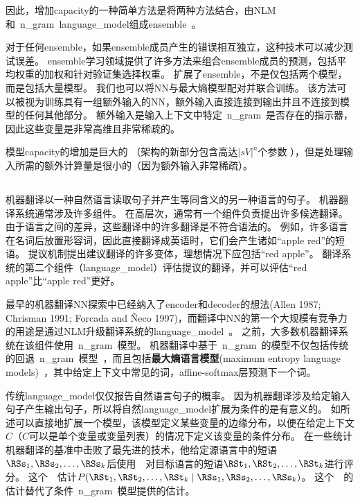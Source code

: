 因此，增加\gls{capacity}的一种简单方法是将两种方法结合，由\gls{NLM}和~\gls{n_gram}~\gls{language_model}组成\gls{ensemble}~\citep{BenDucVin01-small,Bengio-nnlm2003-small}。

对于任何\gls{ensemble}，如果\gls{ensemble}成员产生的错误相互独立，这种技术可以减少测试误差。
\gls{ensemble}学习领域提供了许多方法来组合\gls{ensemble}成员的预测，包括平均权重的加权和针对验证集选择权重。
\citet{Mikolov-Interspeech-2011} 扩展了\gls{ensemble}，不是仅包括两个模型，而是包括大量模型。
我们也可以将\gls{NN}与最大熵模型配对并联合训练\citep{Mikolov-ASRU-2011}。
该方法可以被视为训练具有一组额外输入的\gls{NN}，额外输入直接连接到输出并且不连接到模型的任何其他部分。
额外输入是输入上下文中特定~\gls{n_gram}~是否存在的指示器，因此这些变量是非常高维且非常稀疏的。

模型\gls{capacity}的增加是巨大的 （架构的新部分包含高达$| sV |^n$个参数 ），但是处理输入所需的额外计算量是很小的（因为额外输入非常稀疏）。

\subsection{}
\label{sec:neural_machine_translation}

机器翻译以一种自然语言读取句子并产生等同含义的另一种语言的句子。
机器翻译系统通常涉及许多组件。
在高层次，通常有一个组件负责提出许多候选翻译。
由于语言之间的差异，这些翻译中的许多翻译是不符合语法的。
例如，许多语言在名词后放置形容词，因此直接翻译成英语时，它们会产生诸如``apple red''的短语。
提议机制提出建议翻译的许多变体，理想情况下应包括``red apple''。
翻译系统的第二个组件（\gls{language_model}）评估提议的翻译，并可以评估``red apple''比``apple red''更好。


最早的机器翻译\gls{NN}探索中已经纳入了\gls{encoder}和\gls{decoder}的想法(Allen 1987; Chrisman 1991; Forcada
and Ñeco 1997)，而翻译中\gls{NN}的第一个大规模有竞争力的用途是通过\gls{NLM}升级翻译系统的\gls{language_model}~\citep{Schwenk-et-al-IWSLT2006,Schwenk-2010}。
之前，大多数机器翻译系统在该组件使用~\gls{n_gram}~模型。
机器翻译中基于~\gls{n_gram}~的模型不仅包括传统的回退~\gls{n_gram}~模型~\citep{Jelinek+Mercer80,Katz87,Chen+Goodman99}，而且包括\textbf{最大熵语言模型}(maximum entropy language models)~\citep{MaxEnt96}，其中给定上下文中常见的词，affine-softmax层预测下一个词。

传统\gls{language_model}仅仅报告自然语言句子的概率。
因为机器翻译涉及给定输入句子产生输出句子，所以将自然\gls{language_model}扩展为条件的是有意义的。
如所述可以直接地扩展一个模型，该模型定义某些变量的边缘分布，以便在给定上下文$C$（$C$可以是单个变量或变量列表）的情况下定义该变量的条件分布。
\citet{Devlin-et-al-ACL2014}在一些统计机器翻译的基准中击败了最先进的技术，他给定源语言中的短语$\RSs_1, \RSs_2,\ldots, \RSs_k$后使用~~对目标语言的短语$\RSt_1, \RSt_2,\ldots, \RSt_k$进行评分。
这个~~估计$P(\RSt_1, \RSt_2,\ldots, \RSt_k \mid \RSs_1, \RSs_2,\ldots, \RSs_k)$。
这个~~的估计替代了条件~\gls{n_gram}~模型提供的估计。

